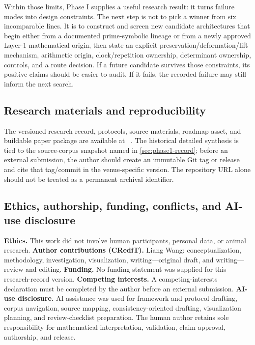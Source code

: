 Within those limits, Phase I supplies a useful research result: it turns
failure modes into design constraints. The next step is not to pick a winner
from six incomparable lines. It is to construct and screen new \sameobject{}
candidate architectures that begin either from a documented prime-symbolic
lineage or from a newly approved Layer-1 mathematical origin, then state an
explicit preservation/deformation/lift mechanism, arithmetic origin,
clock/repetition ownership, determinant ownership, controls, and a route
decision. If a future candidate survives those constraints, its positive claims
should be easier to audit. If it fails, the recorded failure may still inform
the next search.

\subsection*{Research materials and reproducibility}

The versioned research record, protocols, source materials, roadmap asset, and
buildable paper package are available at \repo\ \citep{PhaseIRepository}.
The historical detailed synthesis is tied to the source-corpus snapshot named
in \cref{sec:phase1-record}; before an external submission, the author should create
an immutable Git tag or release and cite that tag/commit in the venue-specific
version. The repository URL alone should not be treated as a permanent
archival identifier.

\subsection*{Ethics, authorship, funding, conflicts, and AI-use disclosure}

\textbf{Ethics.} This work did not involve human participants, personal data,
or animal research. \textbf{Author contributions (CRediT).} Liang Wang:
conceptualization, methodology, investigation, visualization, writing---original
draft, and writing---review and editing. \textbf{Funding.} No funding statement
was supplied for this research-record version. \textbf{Competing interests.}
A competing-interests declaration must be completed by the author before an
external submission. \textbf{AI-use disclosure.} AI assistance was used for
framework and protocol drafting, corpus navigation, source mapping,
consistency-oriented drafting, visualization planning, and review-checklist
preparation. The human author retains sole responsibility for mathematical
interpretation, validation, claim approval, authorship, and release.

